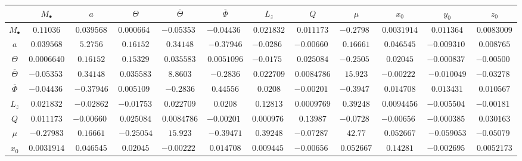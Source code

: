 \begin{table}
\begin{tabular}{cccccccccccc}
 & $M_\bullet$ & $a$ & $\Theta$ & $\overline{\Theta}$ & $\overline{\Phi}$ & $L_z$ & $Q$ & $\mu$ & $x_0$ & $y_0$ & $z_0$ \\ \midrule
$M_\bullet$ & $\num{0.11036}$ & $\num{0.039568}$ & $\num{0.00066402}$ & $\num{-0.053532}$ & $\num{-0.044364}$ & $\num{0.021832}$ & $\num{0.011173}$ & $\num{-0.27983}$ & $\num{0.0031914}$ & $\num{0.011364}$ & $\num{0.0083009}$\\
$a$ & $\num{0.039568}$ & $\num{5.2756}$ & $\num{0.16152}$ & $\num{0.34148}$ & $\num{-0.37946}$ & $\num{-0.02862}$ & $\num{-0.0066052}$ & $\num{0.16661}$ & $\num{0.046545}$ & $\num{-0.0093101}$ & $\num{0.008765}$\\
$\Theta$ & $\num{0.00066402}$ & $\num{0.16152}$ & $\num{0.15329}$ & $\num{0.035583}$ & $\num{0.0051096}$ & $\num{-0.017537}$ & $\num{0.025084}$ & $\num{-0.25054}$ & $\num{0.02045}$ & $\num{-0.00083746}$ & $\num{-0.0050044}$\\
$\overline{\Theta}$ & $\num{-0.053532}$ & $\num{0.34148}$ & $\num{0.035583}$ & $\num{8.8603}$ & $\num{-0.2836}$ & $\num{0.022709}$ & $\num{0.0084786}$ & $\num{15.923}$ & $\num{-0.0022206}$ & $\num{-0.010049}$ & $\num{-0.032782}$\\
$\overline{\Phi}$ & $\num{-0.044364}$ & $\num{-0.37946}$ & $\num{0.0051096}$ & $\num{-0.2836}$ & $\num{0.44556}$ & $\num{0.0208}$ & $\num{-0.0020175}$ & $\num{-0.39471}$ & $\num{0.014708}$ & $\num{0.013431}$ & $\num{0.010567}$\\
$L_z$ & $\num{0.021832}$ & $\num{-0.02862}$ & $\num{-0.017537}$ & $\num{0.022709}$ & $\num{0.0208}$ & $\num{0.12813}$ & $\num{0.0009769}$ & $\num{0.39248}$ & $\num{0.0094456}$ & $\num{-0.0055042}$ & $\num{-0.0018176}$\\
$Q$ & $\num{0.011173}$ & $\num{-0.0066052}$ & $\num{0.025084}$ & $\num{0.0084786}$ & $\num{-0.0020175}$ & $\num{0.0009769}$ & $\num{0.13987}$ & $\num{-0.072871}$ & $\num{-0.0065657}$ & $\num{-0.00038537}$ & $\num{0.030163}$\\
$\mu$ & $\num{-0.27983}$ & $\num{0.16661}$ & $\num{-0.25054}$ & $\num{15.923}$ & $\num{-0.39471}$ & $\num{0.39248}$ & $\num{-0.072871}$ & $\num{42.77}$ & $\num{0.052667}$ & $\num{-0.059053}$ & $\num{-0.050792}$\\
$x_0$ & $\num{0.0031914}$ & $\num{0.046545}$ & $\num{0.02045}$ & $\num{-0.0022206}$ & $\num{0.014708}$ & $\num{0.0094456}$ & $\num{-0.0065657}$ & $\num{0.052667}$ & $\num{0.14281}$ & $\num{-0.0026959}$ & $\num{0.0052173}$\\

\end{tabular}
\end{table}
